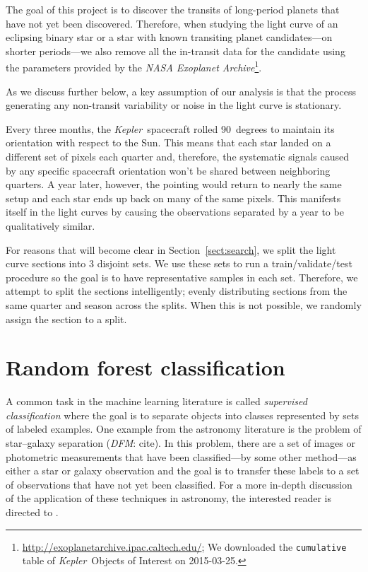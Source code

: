 \documentclass[12pt,preprint]{aastex}
\newcommand{\project}[1]{\textsl{#1}}
\newcommand{\kepler}{\project{Kepler}}
\newcommand{\sectionname}{Section}
\newcommand{\Sect}[1]{\sectionname~\ref{sect:#1}}
\newcommand{\sect}[1]{\Sect{#1}}
\newcommand{\todo}[3]{{\color{#2}\emph{#1}: #3}}
\newcommand{\dfmtodo}[1]{\todo{DFM}{red}{#1}}
\begin{document}
The goal of this project is to discover the transits of long-period planets
that have not yet been discovered.
Therefore, when studying the light curve of an eclipsing binary star or a star
with known transiting planet candidates---on shorter periods---we also remove
all the in-transit data for the candidate using the parameters provided by the
\project{NASA Exoplanet
Archive}\footnote{\url{http://exoplanetarchive.ipac.caltech.edu/}; We
downloaded the \texttt{cumulative} table of \kepler\ Objects of Interest on
2015-03-25.}.

As we discuss further below, a key assumption of our analysis is that the
process generating any non-transit variability or noise in the light curve
is stationary.

Every three months, the \kepler\ spacecraft rolled 90~degrees to maintain its
orientation with respect to the Sun.
This means that each star landed on a different set of pixels each quarter
and, therefore, the systematic signals caused by any specific spacecraft
orientation won't be shared between neighboring quarters.
A year later, however, the pointing would return to nearly the same setup and
each star ends up back on many of the same pixels.
This manifests itself in the light curves by causing the observations
separated by a year to be qualitatively similar.

For reasons that will become clear in \sect{search}, we split the light curve
sections into 3 disjoint sets.
We use these sets to run a train/validate/test procedure so the goal is to
have representative samples in each set.
Therefore, we attempt to split the sections intelligently; evenly
distributing sections from the same quarter and season across the splits.
When this is not possible, we randomly assign the section to a split.


\section{Random forest classification}

A common task in the machine learning literature is called \emph{supervised
classification} where the goal is to separate objects into classes
represented by sets of labeled examples.
One example from the astronomy literature is the problem of star--galaxy
separation (\dfmtodo{cite}).
In this problem, there are a set of images or photometric measurements that
have been classified---by some other method---as either a star or galaxy
observation and the goal is to transfer these labels to a set of observations
that have not yet been classified.
For a more in-depth discussion of the application of these techniques in
astronomy, the interested reader is directed to \citet{Ivezic:2013}.
\end{document}
